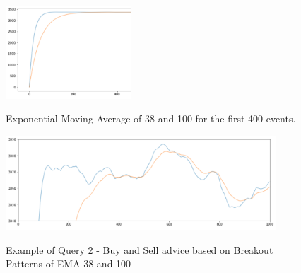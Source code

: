 \begin{figure}[!ht]
    \begin{center}
        \includegraphics[width=0.42\textwidth]{./images/query2_example_200.png}
        \label{fig:EMA200}
        \caption{Exponential Moving Average of 38 and 100 for the first 400 events. }
    \end{center}
\end{figure}



\begin{figure}[!ht]
    \begin{center}
        \includegraphics[width=0.90\textwidth]{./images/query2_example.png}
        \label{fig:EMAs}
        \caption{Example of Query 2 - Buy and Sell advice based on Breakout Patterns of EMA 38 and 100 }
    \end{center}
\end{figure}
